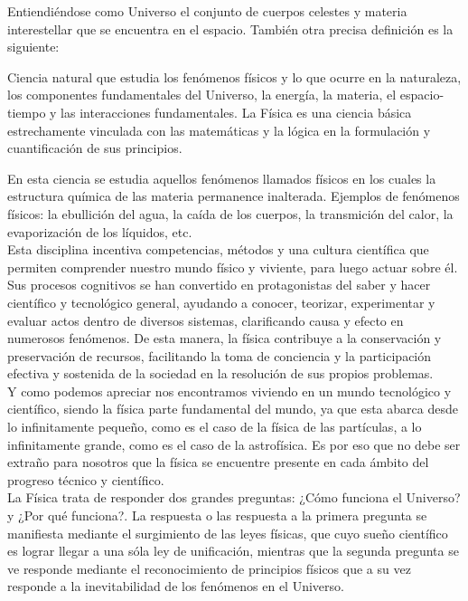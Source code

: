 \documentclass[a5paper,pagesize,10pt,bibtotoc,pointlessnumbers,
normalheadings,DIV=9,fleqn,x11names,table,twoside=false]{scrbook}
\begin{document}
Entiendiéndose como Universo el conjunto de cuerpos celestes y materia interestellar que se encuentra en el espacio. También otra 
precisa definición es la siguiente:

\begin{tcolorbox}
Ciencia natural que estudia los fenómenos físicos y lo que ocurre en la naturaleza, los componentes fundamentales del Universo, la 
energía, la materia, el espacio-tiempo y las interacciones fundamentales. La Física es una ciencia básica estrechamente vinculada 
con las matemáticas y la lógica en la formulación y cuantificación de sus principios.
\end{tcolorbox}

En esta ciencia se estudia aquellos fenómenos llamados físicos en los cuales la estructura química de las materia permanence 
inalterada. Ejemplos de fenómenos físicos: la ebullición del agua, la caída de los cuerpos, la transmición del calor, la 
evaporización de los líquidos, etc.\\

Esta disciplina incentiva competencias, métodos y una cultura científica que permiten comprender nuestro mundo físico y viviente, 
para luego actuar sobre él. Sus procesos cognitivos se han convertido en protagonistas del saber y hacer científico y tecnológico 
general, ayudando a conocer, teorizar, experimentar y evaluar actos dentro de diversos sistemas, clarificando causa y efecto en 
numerosos fenómenos. De esta manera, la física contribuye a la conservación y preservación de recursos, facilitando la toma de 
conciencia y la participación efectiva y sostenida de la sociedad en la resolución de sus propios problemas.\\

Y como podemos apreciar nos encontramos viviendo en un mundo tecnológico y científico, siendo la física parte fundamental del 
mundo, ya que esta abarca desde lo infinitamente pequeño, como es el caso de la física de las partículas, a lo infinitamente 
grande, como es el caso de la astrofísica. Es por eso que no debe ser extraño para nosotros que la física se encuentre presente en 
cada ámbito del progreso técnico y científico.\\

La Física trata de responder dos grandes preguntas: ¿Cómo funciona el Universo? y ¿Por qué funciona?. La respuesta o las respuesta 
a la primera pregunta se manifiesta mediante el surgimiento de las leyes físicas, que cuyo sueño científico es lograr llegar a una 
sóla ley de unificación, mientras que la segunda pregunta se ve responde mediante el reconocimiento de principios físicos que a su 
vez responde a la inevitabilidad de los fenómenos en el Universo.
\end{document}
